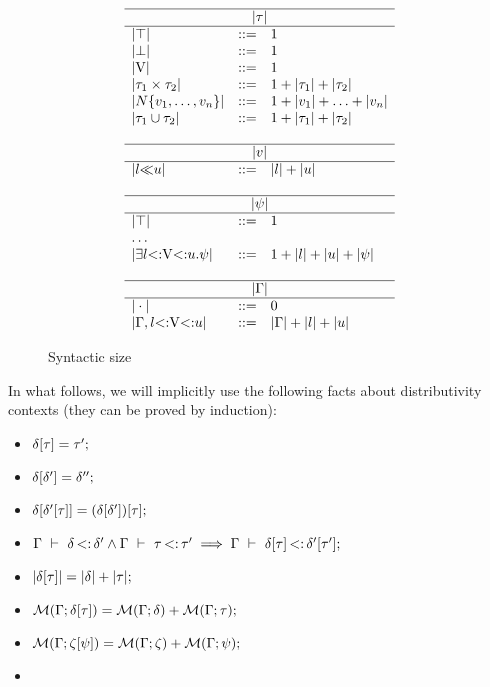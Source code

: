 \begin{figure}
\footnotesize
\[
\begin{array}{lcl}
    \hline
    \multicolumn{3}{c}{\size{\ty}} \\ 
    \hline 
    \size{\tyany} &::=& 1\\
    \size{\tybot} &::=& 1\\
    \size{\vany}  &::=& 1\\
    \size{\typair{\ty_1}{\ty_2}}  &::=& 1 + \size{\ty_1} + \size{\ty_2}\\
    \size{\tyinv\iname{\rexvar_1,\ldots,\rexvar_n}} &::=&
        1 + \size{\rexvar_1} + \ldots + \size{\rexvar_n}\\
    \size{\tyunion{\ty_1}{\ty_2}} &::=& 1 + \size{\ty_1} + \size{\ty_2}\\
    \\
    \hline
    \multicolumn{3}{c}{\size{\rexvar}} \\ 
    \hline 
    \size{\rexvarbound{\tylb}{\tyub}} &::=& \size{\tylb} + \size{\tyub}\\
    \\
    \hline
    \multicolumn{3}{c}{\size{\tysig}} \\ 
    \hline 
    \size{\tyany} &::=& 1\\
    \multicolumn{3}{l}{\ldots} \\
    \size{\tyexist{\vany}{\tylb}{\tyub}{\tysig}} &::=& 
        1 + \size{\tylb} + \size{\tyub} + \size{\tysig}\\
    \\
    \hline
    \multicolumn{3}{c}{\size{\AEnv}} \\ 
    \hline 
    \size{\EmptyEnv} &::=& 0 \\
    \size{\AEnv, \varbound{\vany}{\tylb}{\tyub}} &::=& 
        \size{\AEnv} + \size{\tylb} + \size{\tyub}\\
\end{array}
\]
\caption{Syntactic size}\label{fig:ty-size}
\end{figure}

In what follows, we will implicitly use the following facts about
distributivity contexts (they can be proved by induction):
\begin{itemize}
    \item $\delta[\tau] = \tau';$
    \item $\delta[\delta'] = \delta'';$
    \item $\delta[\delta'[\tau]] = 
        (\delta[\delta'])[\tau];$
    \item $\Gamma\ \vdash\ \delta \operatorname{<:} \delta' \land \Gamma\ \vdash\ \tau \operatorname{<:} \tau'
        \implies \Gamma\ \vdash\ \delta[\tau] \operatorname{<:} \delta'[\tau'];$
    \item $|\delta[\tau]| = |\delta| + |\tau|;$
    \item $\operatorname{\mathcal{M}}(\Gamma;\delta[\tau]) = \operatorname{\mathcal{M}}(\Gamma;\delta) + \operatorname{\mathcal{M}}(\Gamma;\tau);$
    \item $\operatorname{\mathcal{M}}(\Gamma;\zeta[\psi]) = 
        \operatorname{\mathcal{M}}(\Gamma;\zeta) + \operatorname{\mathcal{M}}(\Gamma;\psi);$
    \item {}
\end{itemize}


